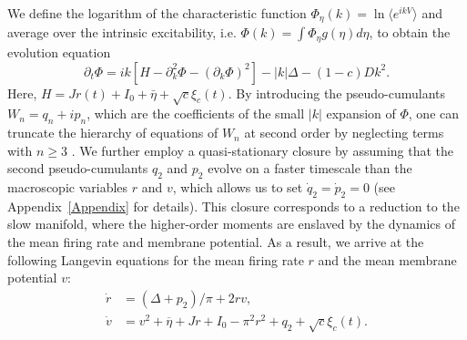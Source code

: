 \documentclass[aps,twocolumn,pre]{revtex4-2}
\begin{document}
We define the logarithm of the characteristic function $\Phi_\eta(k)=\ln\langle e^{ikV}\rangle$ and average over the intrinsic excitability, i.e. $\Phi(k)=\int\Phi_\eta g(\eta)d\eta$, to obtain the evolution equation
\begin{equation}
    \partial_t\Phi=ik[H-\partial^2_k\Phi-(\partial_k\Phi)^2]-|k|\Delta-(1-c)Dk^2.
    \label{Eq:Charac_Func}
\end{equation}
Here, $H=Jr(t)+I_0+\bar{\eta}+\sqrt{c}\xi_c(t)$.
By introducing the pseudo-cumulants $W_n=q_n+ip_n$, which are the coefficients of the small $|k|$ expansion of $\Phi$, one can truncate the hierarchy of equations of $W_n$ at second order by neglecting terms with $n \geq 3$ \cite{goldobin2021reduction}. We further employ a quasi-stationary closure by assuming that the second pseudo-cumulants $q_2$ and $p_2$ evolve on a faster timescale than the macroscopic variables $r$ and $v$, which allows us to set $\dot{q}_2=\dot{p}_2=0$ (see Appendix~\ref{Appendix} for details). This closure corresponds to a reduction to the slow manifold, where the higher-order moments are enslaved by the dynamics of the mean firing rate and membrane potential. As a result, we arrive at the following Langevin equations for the mean firing rate $r$ and the mean membrane potential $v$:
\begin{equation}
\begin{aligned}
\dot{r} &= (\Delta+p_2) /\pi + 2rv, \\
\dot{v} &= v^2 + \overline{\eta} + Jr + I_0 - \pi^2 r^2 + q_2 + \sqrt{c}\xi_c(t).
\end{aligned}
\label{Eq:Langevin_r_v}
\end{equation}
\end{document}
